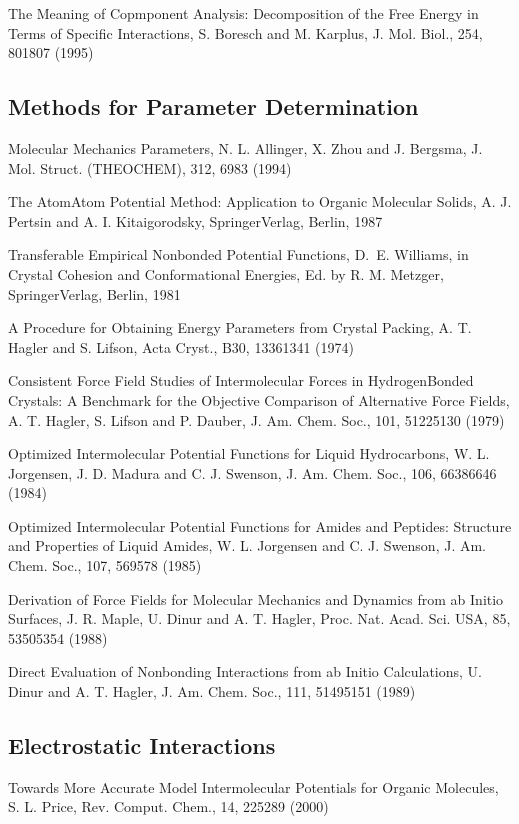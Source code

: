 \documentclass[letterpaper,11pt,english]{sphinxmanual}
\begin{document}
The Meaning of Copmponent Analysis: Decomposition of the Free Energy in Terms of Specific Interactions, S. Boresch and M. Karplus, J. Mol. Biol., 254, 801\sphinxhyphen{}807 (1995)


\subsection{Methods for Parameter Determination}
\label{\detokenize{text/references:methods-for-parameter-determination}}
Molecular Mechanics Parameters, N. L. Allinger, X. Zhou and J. Bergsma, J. Mol. Struct. (THEOCHEM), 312, 69\sphinxhyphen{}83 (1994)

The Atom\sphinxhyphen{}Atom Potential Method: Application to Organic Molecular Solids, A. J. Pertsin and A. I. Kitaigorodsky, Springer\sphinxhyphen{}Verlag, Berlin, 1987

Transferable Empirical Nonbonded Potential Functions, D. E. Williams, in Crystal Cohesion and Conformational Energies, Ed. by R. M. Metzger, Springer\sphinxhyphen{}Verlag, Berlin, 1981

A Procedure for Obtaining Energy Parameters from Crystal Packing, A. T. Hagler and S. Lifson, Acta Cryst., B30, 1336\sphinxhyphen{}1341 (1974)

Consistent Force Field Studies of Intermolecular Forces in Hydrogen\sphinxhyphen{}Bonded Crystals:  A Benchmark for the Objective Comparison of Alternative Force Fields, A. T. Hagler, S. Lifson and P. Dauber, J. Am. Chem. Soc., 101, 5122\sphinxhyphen{}5130 (1979)

Optimized Intermolecular Potential Functions for Liquid Hydrocarbons, W. L. Jorgensen, J. D. Madura and C. J. Swenson, J. Am. Chem. Soc., 106, 6638\sphinxhyphen{}6646 (1984)

Optimized Intermolecular Potential Functions for Amides and Peptides: Structure and Properties of Liquid Amides, W. L. Jorgensen and C. J. Swenson, J. Am. Chem. Soc., 107, 569\sphinxhyphen{}578 (1985)

Derivation of Force Fields for Molecular Mechanics and Dynamics from ab Initio Surfaces, J. R. Maple, U. Dinur and A. T. Hagler, Proc. Nat. Acad. Sci. USA, 85, 5350\sphinxhyphen{}5354 (1988)

Direct Evaluation of Nonbonding Interactions from ab Initio Calculations, U. Dinur and A. T. Hagler, J. Am. Chem. Soc., 111, 5149\sphinxhyphen{}5151 (1989)


\subsection{Electrostatic Interactions}
\label{\detokenize{text/references:electrostatic-interactions}}
Towards More Accurate Model Intermolecular Potentials for Organic Molecules, S. L. Price, Rev. Comput. Chem., 14, 225\sphinxhyphen{}289 (2000)
\end{document}
